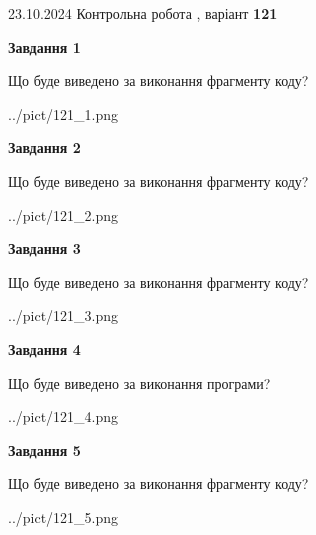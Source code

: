 \documentclass[12pt, ukrainian]{article}
\begin{document}
{\Large{23.10.2024 Контрольна робота , варіант  \No \textbf { 121 }\par}}
{
\begin {large}
{\begin {center}\textbf{Завдання 1}\end {center}}

Що буде виведено за виконання фрагменту коду?\par
\begin{center}
	{../pict/121_1.png}
\end{center}
\newpage

{\begin {center}\textbf{Завдання 2}\end {center}}

Що буде виведено за виконання фрагменту коду?\par
\begin{center}
	{../pict/121_2.png}
\end{center}
\newpage

{\begin {center}\textbf{Завдання 3}\end {center}}

Що буде виведено за виконання фрагменту коду?\par
\begin{center}
	{../pict/121_3.png}
\end{center}
\newpage

{\begin {center}\textbf{Завдання 4}\end {center}}

Що буде виведено за виконання програми?\par
\begin{center}
	{../pict/121_4.png}
\end{center}
\newpage

{\begin {center}\textbf{Завдання 5}\end {center}}

Що буде виведено за виконання фрагменту коду?\par
\begin{center}
	{../pict/121_5.png}
\end{center}
\newpage


\end{large}}
\end{document}
